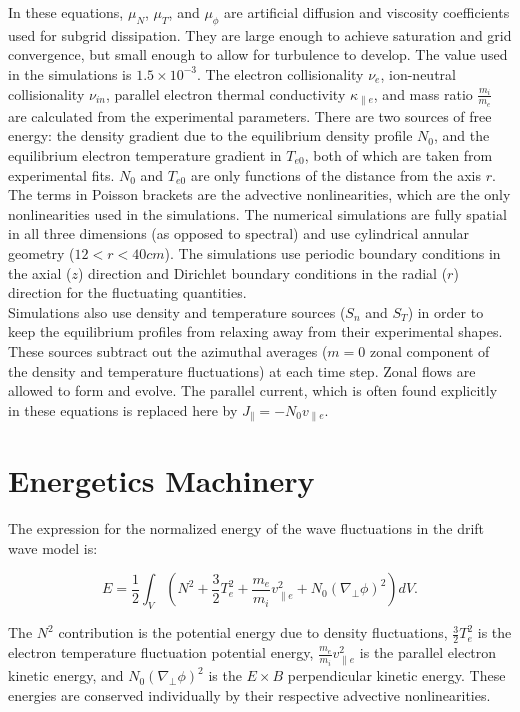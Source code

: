 \documentclass[12pt]{article}
\def\beq{\begin{equation}}
\def\eeq{\end{equation}}
\def\para{\parallel}
\def\grad{\nabla}
\newcommand{\gradperp}{\grad_\perp}
\newcommand{\vpe}{v_{\parallel e}}
\newcommand{\nue}{\nu_{e}}
\newcommand{\nuin}{\nu_{in}}
\newcommand{\kpe}{\kappa_{\parallel e}}
\newcommand{\fmie}{\frac{m_i}{m_e}}
\begin{document}
In these equations, $\mu_N$, $\mu_T$, and $\mu_\phi$ are artificial diffusion and viscosity coefficients used for subgrid dissipation. They are large enough to achieve saturation
and grid convergence, but small enough to allow for turbulence to develop. The value used in the simulations is $1.5 \times 10^{-3}$. The electron collisionality $\nue$, ion-neutral
collisionality $\nuin$, parallel electron thermal conductivity $\kpe$, and mass ratio $\fmie$ are calculated from the experimental parameters.
There are two sources of free energy: the density gradient due to the equilibrium density profile $N_0$, and the equilibrium electron temperature gradient in $T_{e0}$, both of which are
taken from experimental fits. $N_0$ and $T_{e0}$ are only functions of the distance from the axis $r$. \\

The terms in Poisson brackets are the advective nonlinearities, which are the only nonlinearities used in the simulations.
The numerical simulations are fully spatial in all three dimensions (as opposed to spectral) and use cylindrical annular geometry ($12<r<40 cm$).
The simulations use periodic boundary conditions in the axial ($z$) direction and Dirichlet boundary
conditions in the radial ($r$) direction for the fluctuating quantities. \\

Simulations also use density and temperature sources ($S_n$ and $S_T$) in order to keep the equilibrium profiles from relaxing away from their experimental shapes. 
These sources subtract out the azimuthal averages ($m=0$ zonal component of the density and temperature fluctuations) at each time step. 
Zonal flows are allowed to form and evolve. The parallel current, which is often found explicitly in these equations is replaced here by $J_\para = - N_0 \vpe$. \\


\section{Energetics Machinery}
\label{sec_energetics_machinery}


The expression for the normalized energy of the wave fluctuations in the drift wave model is:

\beq
\label{energy_eq}
E = \frac{1}{2} \int_V  (N^2 + \frac{3}{2} T_e^2 + \frac{m_e}{m_i} \vpe^2 + N_0 (\gradperp \phi)^2 ) dV.
\eeq

The $N^2$ contribution is the potential energy due to density fluctuations, $\frac{3}{2} T_e^2$ is the electron temperature fluctuation potential energy,
$\frac{m_e}{m_i} \vpe^2$ is the parallel electron kinetic energy, and $N_0 (\gradperp \phi)^2$ is the $E \times B$ perpendicular kinetic energy.
These energies are conserved individually by their respective advective nonlinearities. \\
\end{document}
